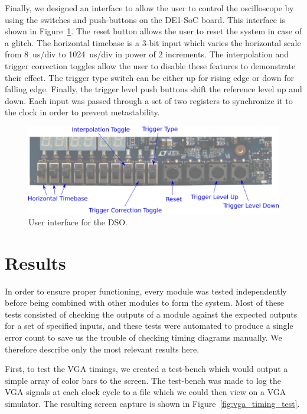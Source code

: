 \documentclass[journal,hidelinks]{IEEEtran}
\begin{document}
Finally, we designed an interface to allow the user to control the oscilloscope by using the switches and push-buttons on the DE1-SoC board. This interface is shown in Figure~\ref{fig:ui}. The reset button allows the user to reset the system in case of a glitch. The horizontal timebase is a 3-bit input which varies the horizontal scale from 8~us/div to 1024~us/div in power of 2 increments. The interpolation and trigger correction toggles allow the user to disable these features to demonstrate their effect. The trigger type switch can be either up for rising edge or down for falling edge. Finally, the trigger level push buttons shift the reference level up and down. Each input was passed through a set of two registers to synchronize it to the clock in order to prevent metastability.

\begin{figure}[!htb]
  \centering
  \includegraphics[width=\columnwidth]{diagrams/UI.PNG}
  \caption{User interface for the DSO.}
  \label{fig:ui}
\end{figure}

\section{Results}

In order to ensure proper functioning, every module was tested independently before being combined with other modules to form the system. Most of these tests consisted of checking the outputs of a module against the expected outputs for a set of specified inputs, and these tests were automated to produce a single error count to save us the trouble of checking timing diagrams manually. We therefore describe only the most relevant results here.

First, to test the VGA timings, we created a test-bench which would output a simple array of color bars to the screen. The test-bench was made to log the VGA signals at each clock cycle to a file which we could then view on a VGA simulator. The resulting screen capture is shown in Figure~\ref{fig:vga_timing_test}.
\end{document}
